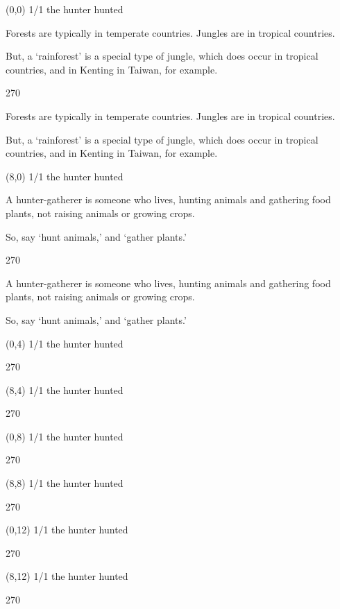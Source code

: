 \documentclass[a4paper]{article}
\newenvironment{itemize*}%
{\begin{itemize}%
 \setlength{\itemsep}{0.5cm}%
 \setlength{\parsep}{0pt}%
 \setlength{\parskip}{0pt}}%
{\end{itemize}}
\newcommand{\mycard}[3]{%
	\small #1 #2
	\par
	\parbox[t][6.8cm][c]{9.5cm}{%
	\par
	\myleft{#3}
	\par
	\myright{#3}
	}
}
\newcommand{\myleft}[1]{%
	\begin{sideways}
	\hspace*{-0.9cm}
		\parbox[t][2.7cm][t]{6.5cm}{%
		\large #1
		}
	\end{sideways}
}
\newcommand{\myright}[1]{%
	\hspace*{6.5cm}
	\begin{turn}{270}
	\hspace*{-7.1cm}
		\parbox[t][2.7cm][t]{6.5cm}{%
		\large #1
		}
	\end{turn}
}
\begin{document}
\begin{textblock}{8}(0,0)
\mycard{1/1}{the hunter hunted}{
\begin{itemize*}
\item Forests are typically in temperate countries. Jungles are in tropical countries.
\item But, a `rainforest' is a special type of jungle, which does occur in tropical countries, and in Kenting in Taiwan, for example.
\end{itemize*}
}
\end{textblock}

\begin{textblock}{8}(8,0)
\mycard{1/1}{the hunter hunted}{
\begin{itemize*}
\item A hunter-gatherer is someone who lives, hunting animals and gathering food plants, not raising animals or growing crops.
\item So, say `hunt animals,' and `gather plants.'
\end{itemize*}
}
\end{textblock}

\begin{textblock}{8}(0,4)
\mycard{1/1}{the hunter hunted}{
\vspace{-0.40cm}
}
\end{textblock}

\begin{textblock}{8}(8,4)
\mycard{1/1}{the hunter hunted}{
}
\end{textblock}

\begin{textblock}{8}(0,8)
\mycard{1/1}{the hunter hunted}{
}
\end{textblock}

\begin{textblock}{8}(8,8)
\mycard{1/1}{the hunter hunted}{
}
\end{textblock}

\begin{textblock}{8}(0,12)
\mycard{1/1}{the hunter hunted}{
}
\end{textblock}

\begin{textblock}{8}(8,12)
\mycard{1/1}{the hunter hunted}{
}
\end{textblock}

\null
\newpage
\end{document}
